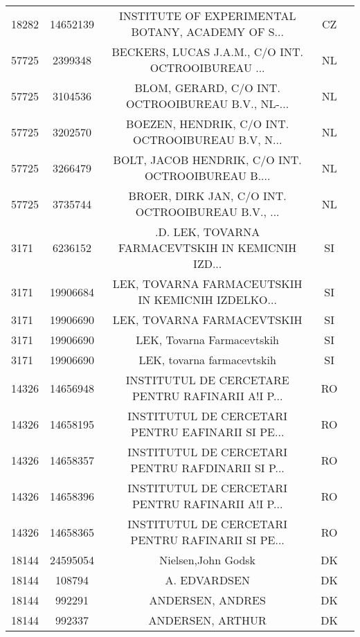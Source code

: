\begin{longtable}{|l|c|c|c|c|}
     18282 &   14652139 &  INSTITUTE OF EXPERIMENTAL BOTANY, ACADEMY OF S... &      CZ \\
     57725 &    2399348 &  BECKERS, LUCAS J.A.M., C/O INT. OCTROOIBUREAU ... &      NL \\
     57725 &    3104536 &  BLOM, GERARD, C/O INT. OCTROOIBUREAU B.V., NL-... &      NL \\
     57725 &    3202570 &  BOEZEN, HENDRIK, C/O INT. OCTROOIBUREAU B.V, N... &      NL \\
     57725 &    3266479 &  BOLT, JACOB HENDRIK, C/O INT. OCTROOIBUREAU B.... &      NL \\
     57725 &    3735744 &  BROER, DIRK JAN, C/O INT. OCTROOIBUREAU B.V., ... &      NL \\
      3171 &    6236152 &  .D. LEK, TOVARNA FARMACEVTSKIH IN KEMICNIH IZD... &      SI \\
      3171 &   19906684 &  LEK, TOVARNA FARMACEUTSKIH IN KEMICNIH IZDELKO... &      SI \\
      3171 &   19906690 &                         LEK, TOVARNA FARMACEVTSKIH &      SI \\
      3171 &   19906690 &                         LEK, Tovarna Farmacevtskih &      SI \\
      3171 &   19906690 &                         LEK, tovarna farmacevtskih &      SI \\
     14326 &   14656948 &  INSTITUTUL DE CERCETARE PENTRU RAFINARII A!I P... &      RO \\
     14326 &   14658195 &  INSTITUTUL DE CERCETARI PENTRU EAFINARII SI PE... &      RO \\
     14326 &   14658357 &  INSTITUTUL DE CERCETARI PENTRU RAFDINARII SI P... &      RO \\
     14326 &   14658396 &  INSTITUTUL DE CERCETARI PENTRU RAFINARII A!I P... &      RO \\
     14326 &   14658365 &  INSTITUTUL DE CERCETARI PENTRU RAFINARII SI PE... &      RO \\
     18144 &   24595054 &                                 Nielsen,John Godsk &      DK \\
     18144 &     108794 &                                       A. EDVARDSEN &      DK \\
     18144 &     992291 &                                   ANDERSEN, ANDRES &      DK \\
     18144 &     992337 &                                   ANDERSEN, ARTHUR &      DK \\

\end{longtable}
